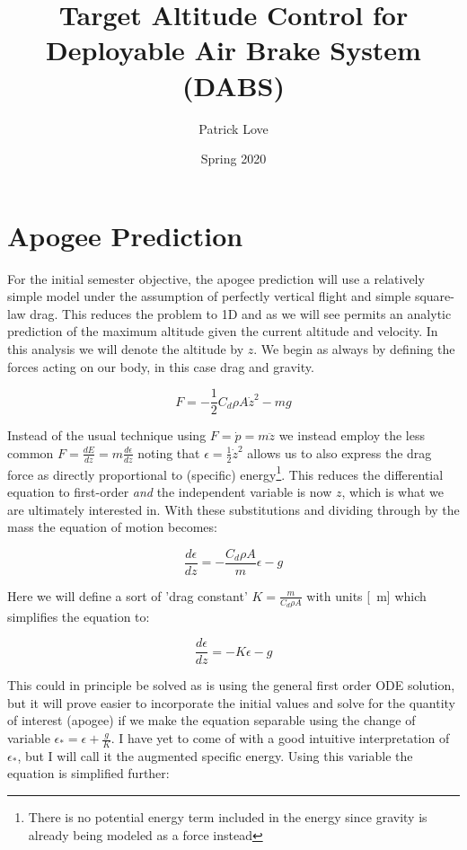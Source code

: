 \documentclass{article}
\title{Target Altitude Control for Deployable Air Brake System (DABS)}
\date{Spring 2020}
\author{Patrick Love}
\begin{document}
	
	\maketitle
	
	\section{Apogee Prediction}
	
	For the initial semester objective, the apogee prediction will use a relatively simple model under the assumption of perfectly vertical flight and simple square-law drag.  This reduces the problem to 1D and as we will see permits an analytic prediction of the maximum altitude given the current altitude and velocity.  In this analysis we will denote the altitude by $z$.  We begin as always by defining the forces acting on our body, in this case drag and gravity.
	
	\begin{equation}
		F = -\frac{1}{2}C_d\rho A\dot{z}^2-mg
	\end{equation}
	
	Instead of the usual technique using $F=\dot{p}=m\ddot{z}$ we instead employ the less common $F=\frac{dE}{dz}=m\frac{d\epsilon}{dz}$ noting that $\epsilon=\frac{1}{2}\dot{z}^2$ allows us to also express the drag force as directly proportional to (specific) energy\footnote{There is no potential energy term included in the energy since gravity is already being modeled as a force instead}.  This reduces the differential equation to first-order \textit{and} the independent variable is now $z$, which is what we are ultimately interested in.  With these substitutions and dividing through by the mass the equation of motion becomes:
	
	\begin{equation}
		\frac{d\epsilon}{dz} = -\frac{C_d\rho A}{m}\epsilon-g 
	\end{equation}
	
	Here we will define a sort of 'drag constant' $K = \frac{m}{C_d\rho A}$ with units [\si{\per\meter}] which simplifies the equation to:
	
	\begin{equation}
	\label{eqn:vertde}
	\frac{d\epsilon}{dz} = -K\epsilon-g 
	\end{equation}
	
	This could in principle be solved as is using the general first order ODE solution, but it will prove easier to incorporate the initial values and solve for the quantity of interest (apogee) if we make the equation separable using the change of variable $\epsilon_* = \epsilon+\frac{g}{K}$.  I have yet to come of with a good intuitive interpretation of $\epsilon_*$, but I will call it the augmented specific energy.  Using this variable the equation is simplified further:
	
\end{document}
